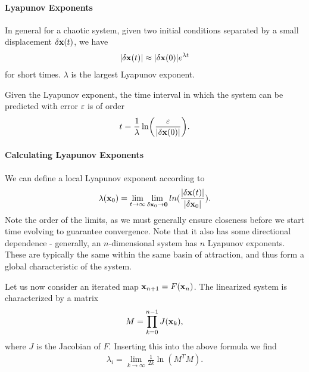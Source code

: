 \paragraph{Lyapunov Exponents}
In general for a chaotic system, given two initial conditions separated by a small displacement $\delta\vb{x}(t)$, we have
\begin{align*}
	\abs{\delta\vb{x}(t)} \approx \abs{\delta\vb{x}(0)}e^{\lambda t}
\end{align*}
for short times. $\lambda$ is the largest Lyapunov exponent.

Given the Lyapunov exponent, the time interval in which the system can be predicted with error $\varepsilon$ is of order
\begin{align*}
	t = \frac{1}{\lambda}\ln(\frac{\varepsilon}{\abs{\delta\vb{x}(0)}}).
\end{align*}

\paragraph{Calculating Lyapunov Exponents}
We can define a local Lyapunov exponent according to
\begin{align*}
	\lambda(\vb{x}_{0}) = \lim\limits_{t\to\infty}\lim\limits_{\delta\vb{x}_{0}\to \vb{0}}ln(\frac{\abs{\delta\vb{x}(t)}}{\abs{\delta\vb{x}_{0}}}).
\end{align*}
Note the order of the limits, as we must generally ensure closeness before we start time evolving to guarantee convergence. Note that it also has some directional dependence - generally, an $n$-dimensional system has $n$ Lyapunov exponents. These are typically the same within the same basin of attraction, and thus form a global characteristic of the system.

Let us now consider an iterated map $\vb{x}_{n + 1} = F(\vb{x}_{n})$. The linearized system is characterized by a matrix
\begin{align*}
	M = \prod\limits_{k = 0}^{n - 1}J(\vb{x}_{k}),
\end{align*}
where $J$ is the Jacobian of $F$. Inserting this into the above formula we find
\begin{align*}
	\lambda_{i} = \lim\limits_{k\to\infty}\frac{1}{2k}\ln(M^{T}M).
\end{align*}

